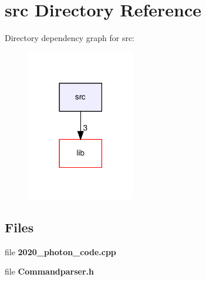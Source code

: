 \section{src Directory Reference}
\label{dir_68267d1309a1af8e8297ef4c3efbcdba}
Directory dependency graph for src\+:\nopagebreak
\begin{figure}[H]
\begin{center}
\leavevmode
\includegraphics[width=134pt]{dir_68267d1309a1af8e8297ef4c3efbcdba_dep}
\end{center}
\end{figure}
\subsection*{Files}
\begin{DoxyCompactItemize}
\item 
file \textbf{ 2020\+\_\+photon\+\_\+code.\+cpp}
\item 
file \textbf{ Commandparser.\+h}
\end{DoxyCompactItemize}
